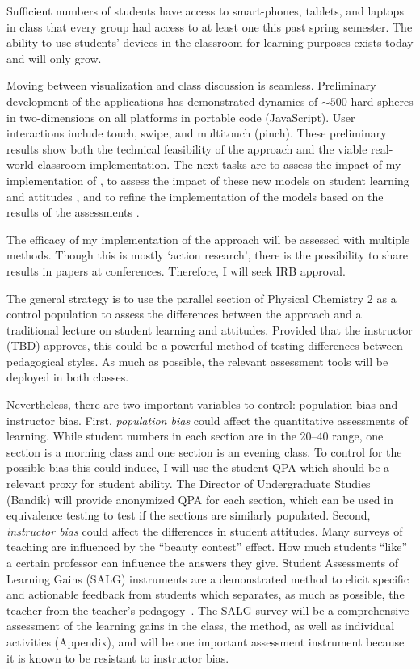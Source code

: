\documentclass[10pt,letterpaper]{article}
\begin{document}
Sufficient numbers of students have access to smart-phones, tablets, and laptops in class that every \pogil group had access to at least one this past spring semester. The ability to use students' devices in the classroom for learning purposes exists today and will only grow. 

Moving between visualization and class discussion is seamless. Preliminary development of the applications has demonstrated dynamics of $\sim500$ hard spheres in two-dimensions on all platforms in portable code (JavaScript). User interactions include touch, swipe, and multitouch (pinch). These preliminary results show both the technical feasibility of the approach and the viable real-world classroom implementation. The next  tasks are to assess the impact of my implementation of \pogil {}, to assess the impact of these new models on student learning and attitudes , and to refine the implementation of the models based on the results of the assessments .


The efficacy of my implementation of the  \pogil approach will be assessed with multiple methods. Though this is mostly `action research', there is the possibility to share results in papers at \pogil conferences. Therefore,  I will seek IRB approval. 

The general strategy is to use the parallel section of Physical Chemistry 2 as a control population to assess the differences between the \pogil approach and a traditional lecture on student learning and attitudes. Provided that the instructor (TBD) approves, this could be a powerful method of testing differences between pedagogical styles. As much as possible, the relevant assessment tools will be deployed in both classes. 

Nevertheless, there are two important variables to control: population bias and instructor bias. First, \textit{population bias} could affect the quantitative assessments of learning. While student numbers in each section are in the 20--40 range, one section is a morning class and one section is an evening class. To control for the possible bias this could induce, I will use the student QPA which should be a relevant proxy for student ability. The Director of Undergraduate Studies (Bandik) will provide anonymized QPA for each section, which can be used in equivalence testing to test if the sections are similarly populated. Second, \textit{instructor bias} could affect the differences in student attitudes. Many surveys of teaching are influenced by the ``beauty contest'' effect. How much students ``like'' a certain professor can influence the answers they give. Student Assessments of Learning Gains (SALG) instruments are a demonstrated method to elicit specific and actionable feedback from students which separates, as much as possible, the teacher from the teacher's pedagogy~\cite{Seymour2000}. The SALG survey will be a comprehensive assessment of the learning gains in the class, the \pogil method, as well as individual activities (Appendix), and will be one important assessment instrument because it is known to be resistant to instructor bias.
\end{document}
